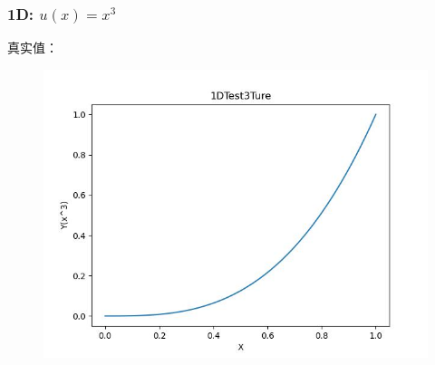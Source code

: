 \documentclass{article}
\begin{document}
\subsubsection{1D: $u(x)=x^3$}
真实值：
\begin{figure}[h]
    \centering
    \includegraphics[width=0.7\linewidth]{1DTest3Ture.jpg}
\end{figure}
\newpage
\end{document}
